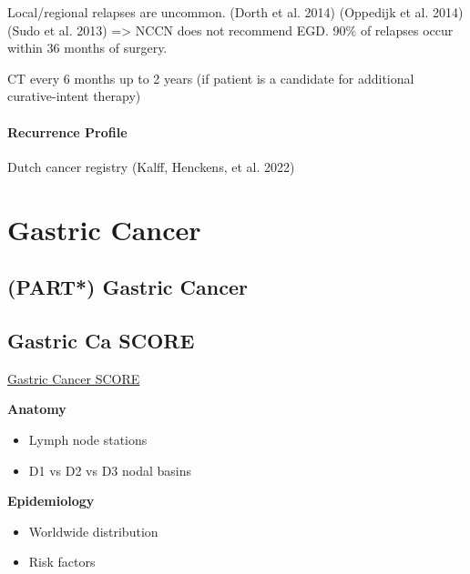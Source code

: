 \documentclass[
  letterpaper,
]{scrbook}
\providecommand{\tightlist}{%
  \setlength{\itemsep}{0pt}\setlength{\parskip}{0pt}}
\begin{document}
Local/regional relapses are uncommon. (Dorth et al. 2014) (Oppedijk et
al. 2014) (Sudo et al. 2013) =\textgreater{} NCCN does not recommend
EGD. 90\% of relapses occur within 36 months of surgery.

CT every 6 months up to 2 years (if patient is a candidate for
additional curative-intent therapy)

\subsection{Recurrence Profile}\label{recurrence-profile}

Dutch cancer registry (Kalff, Henckens, et al. 2022)

\part{Gastric Cancer}

\chapter*{(PART*) Gastric Cancer}\label{part-gastric-cancer}


\chapter*{Gastric Ca SCORE}\label{gastric-ca-score}


\href{http://portal.surgicalcore.org/modulecontent.aspx?id=128003}{Gastric
Cancer SCORE}

\textbf{Anatomy}

\begin{itemize}
\tightlist
\item
  Lymph node stations
\item
  D1 vs D2 vs D3 nodal basins
\end{itemize}

\textbf{Epidemiology}

\begin{itemize}
\tightlist
\item
  Worldwide distribution
\item
  Risk factors
\end{itemize}
\end{document}
